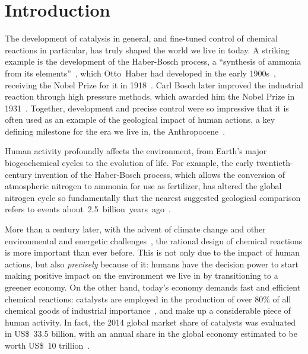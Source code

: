 \chapter*{Introduction}%
\label{ch:introduction}

The development of catalysis in general,
and fine-tuned control of chemical reactions in particular,
has truly shaped the world we live in today.
A striking example is the development of the Haber-Bosch process,
a ``synthesis of ammonia from its elements''~\cite{Nobel_1918},
which Otto~Haber had developed in the early 1900s~\cite{Erisman_2008,Lewis_2015},
receiving the Nobel Prize for it in 1918~\cite{Nobel_1918}.
Carl Bosch later improved the industrial reaction through high pressure methods,
which awarded him the Nobel Prize in 1931~\cite{Nobel_1931}.
Together,
development and precise control were so impressive that it is often used
as an example of the geological impact of human actions,
a key defining milestone for
the era we live in,
the Anthropocene~\cite{Smil_1999,Canfield_2010,Lewis_2015}.
%
\begin{citacao}
	Human activity profoundly affects the environment,
	from Earth’s major biogeochemical cycles to the evolution of life.
	For example,
	the early twentieth-century invention of the Haber-Bosch process,
	which allows the conversion of atmospheric nitrogen to ammonia for use as fertilizer,
	has altered the global nitrogen cycle so fundamentally
	that the nearest suggested geological comparison refers to events
	about~2.5~billion~years~ago~\cite{Lewis_2015}.
\end{citacao}

More than a century later,
with the advent of climate change and other environmental and energetic challenges~\cite{Bertozzi_2016},
the rational design of chemical reactions is more important than ever before.
This is not only due to the impact of human actions,
but also \emph{precisely} because of it:
humans have the decision power to start making positive impact on the environment we live in
by transitioning to a greener economy.
On the other hand,
today's economy demands fast and efficient chemical reactions:
catalysts are employed in the production of over 80\% of all chemical
goods of industrial
importance~\cite{Breakthrough_Catalyst,GlobalCatalystMarket},
and make up a considerable piece of human activity.
In fact,
the 2014 global market share of catalysts was evaluated in US\$~33.5 billion,
with an annual share in the global economy estimated to be worth US\$~10
trillion~\cite{GlobalCatalystMarket}.

